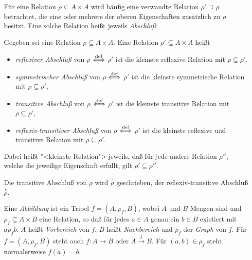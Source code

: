 Für eine Relation $\rho \subseteq A\times A$ wird häufig eine
verwandte Relation $\rho' \supseteq \rho$ betrachtet, die eine oder
mehrere der oberen Eigenschaften zusätzlich zu $\rho$ besitzt.  Eine
solche Relation heißt jeweils \textit{Abschluß}:
%
\begin{definition}
  \label{def:relation-closure}
  Gegeben sei eine Relation $\rho \subseteq A\times A$.  Eine Relation
  $\rho' \subseteq A\times A$ heißt
  \begin{itemize}
  \item \textit{reflexiver Abschluß} von $\rho$ $\stackrel{\rm def}{\Longleftrightarrow}$ $\rho'$ ist
    die kleinste reflexive Relation mit $\rho\subseteq\rho'$,
  \item \textit{symmetrischer Abschluß} von $\rho$ $\stackrel{\rm def}{\Longleftrightarrow}$ $\rho'$ ist
    die kleinste symmetrische Relation mit $\rho\subseteq\rho'$,
  \item \textit{transitive Abschluß} von $\rho$ $\stackrel{\rm def}{\Longleftrightarrow}$ $\rho'$ ist
    die kleinste transitive Relation mit $\rho\subseteq\rho'$,
  \item \textit{reflexiv-transitiver Abschluß} von $\rho$ $\stackrel{\rm def}{\Longleftrightarrow}$
    $\rho'$ ist die kleinste reflexive und transitive Relation mit
    $\rho\subseteq\rho'$.
  \end{itemize}
  Dabei heißt "<kleinste Relation"> jeweils, daß für jede andere
  Relation $\rho''$, welche die jeweilige Eigenschaft erfüllt, gilt
  $\rho' \subseteq \rho''$.
  
  Die transitive Abschluß von $\rho$ wird $\overset{+}{\rho}$
  geschrieben, der reflexiv-transitive Abschluß
  $\overset{\ast}{\rho}$.
\end{definition}


\begin{definition}\label{abbildung} Eine \emph{Abbildung} 
ist ein Tripel $f = (A,\rho_f,B)$, wobei
   $A$ und $B$ Mengen sind und $\rho_f\subseteq A \times B$ eine Relation, so
   daß für jedes $a\in A$ genau ein $b\in B$ existiert mit $a\rho_f b$. 
   $A$ heißt \emph{Vorbereich} von $f$, $B$ heißt \emph{Nachbereich} und
   $\rho_f$ der \emph{Graph} von $f$.
   Für
   $f=(A,\rho_f,B)$ steht auch $f:A\rightarrow B$ oder 
   $A\stackrel{f}{\longrightarrow}B$. Für $(a,b) \in \rho_f$ steht
   normalerweise $f(a) = b$. %
\end{definition}

